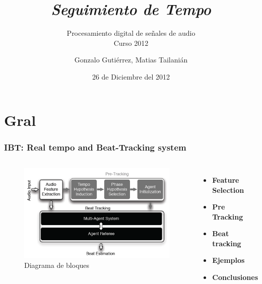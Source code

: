 \documentclass[slidestop,compress,mathserif,xcolor=svgnames,table,xcolor=dvipsnames]{beamer}
\author{Gonzalo Gutiérrez, Matias Tailanián}
\date{26 de Diciembre del 2012}
\title{\textit{Seguimiento de Tempo}}
\subtitle{Procesamiento digital de señales de audio\\Curso 2012}
\newenvironment{itemize*}%
  {\begin{itemize}%
    \setlength{\topsep}{10pt}%
    \setlength{\itemsep}{0pt}%
    \setlength{\parskip}{10pt}}%
  {\end{itemize}
}
\begin{document}
\begin{frame}
  \titlepage
\end{frame}


\section{Gral}
\begin{frame}
\frametitle{IBT: Real tempo and Beat-Tracking system}

\begin{columns}

\column{2in}
\vspace{15pt}
\begin{figure}[h!]
  \begin{center}
  \includegraphics[width=1\textwidth]{./pics/bloques.png}
  \end{center}
  \vspace{-10pt}
  \caption{Diagrama de bloques}
  \label{fig:bloques}
\end{figure}

\column{2in}
\vspace{20pt}
\begin{itemize}
	\item \textbf{Feature Selection}\pause
	\item \textbf{Pre Tracking}\\\pause
	\item \textbf{Beat tracking}\pause
    \item \textbf{Ejemplos}
    \item \textbf{Conclusiones}
\end{itemize}

\end{columns}
\end{frame}
\end{document}
